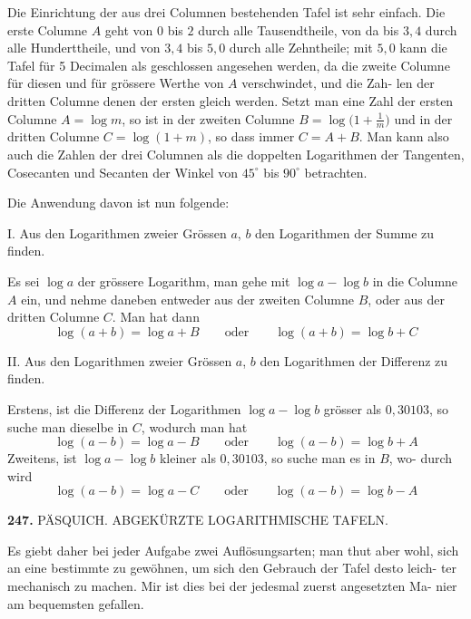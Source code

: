 \documentclass[12pt,a4paper]{article}
\begin{document}
\smallskip\noindent
Die Einrichtung der aus drei Columnen bestehenden Tafel ist sehr einfach.
Die erste Columne $A$ geht von $0$ bis $2$ durch alle Tausendtheile, von da bis $3,4$
durch alle Hunderttheile, und von $3,4$ bis $5,0$ durch alle Zehntheile; mit $5,0$
kann die Tafel für 5 Decimalen als geschlossen angesehen werden, da die zweite
Columne für diesen und für grössere Werthe von $A$ verschwindet, und die Zah-
len der dritten Columne denen der ersten gleich werden. Setzt man eine Zahl
der ersten Columne $A = \log m$, so ist in der zweiten Columne $B = \log\bigl(1+\frac{1}{m}\bigr)$
und in der dritten Columne $C = \log(1+m)$, so dass immer $C = A+B$. Man
kann also auch die Zahlen der drei Columnen als die doppelten Logarithmen der
Tangenten, Cosecanten und Secanten der Winkel von $45^{\circ}$ bis $90^{\circ}$ betrachten.

\smallskip\noindent
Die Anwendung davon ist nun folgende:

\smallskip\noindent
\textsc{I.} Aus den Logarithmen zweier Grössen $a$, $b$ den Logarithmen der Summe
zu finden.

\smallskip\noindent
Es sei $\log a$ der grössere Logarithm, man gehe mit $\log a - \log b$ in die
Columne $A$ ein, und nehme daneben entweder aus der zweiten Columne $B$, oder
aus der dritten Columne $C$. Man hat dann
\begin{equation*}
\log(a+b) = \log a + B \qquad \text{oder} \qquad \log(a+b) = \log b + C
\end{equation*}

\smallskip\noindent
\textsc{II.} Aus den Logarithmen zweier Grössen $a$, $b$ den Logarithmen der Differenz
zu finden.

\smallskip\noindent
Erstens, ist die Differenz der Logarithmen $\log a - \log b$ grösser als $0{,}30103$,
so suche man dieselbe in $C$, wodurch man hat
\begin{equation*}
\log(a-b) = \log a - B \qquad \text{oder} \qquad \log(a-b) = \log b + A
\end{equation*}
Zweitens, ist $\log a - \log b$ kleiner als $0{,}30103$, so suche man es in $B$, wo-
durch wird
\begin{equation*}
\log(a-b) = \log a - C \qquad \text{oder} \qquad \log(a-b) = \log b - A
\end{equation*}

\newpage
\noindent\textbf{247.}\quad
PÄSQUICH. ABGEKÜRZTE LOGARITHMISCHE TAFELN.

\smallskip\noindent
Es giebt daher bei jeder Aufgabe zwei Auflösungsarten; man thut aber wohl,
sich an eine bestimmte zu gewöhnen, um sich den Gebrauch der Tafel desto leich-
ter mechanisch zu machen. Mir ist dies bei der jedesmal zuerst angesetzten Ma-
nier am bequemsten gefallen.
\end{document}
